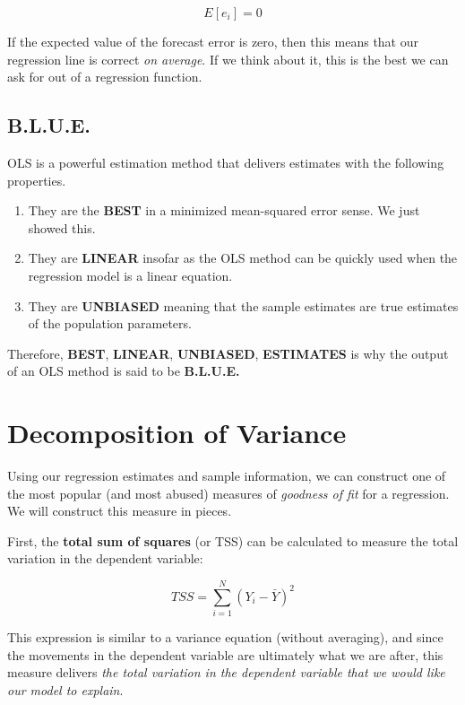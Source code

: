 \documentclass[
]{book}
\begin{document}
\[E[e_i]=0\]

If the expected value of the forecast error is zero, then this means that our regression line is correct \emph{on average}. If we think about it, this is the best we can ask for out of a regression function.

\hypertarget{b.l.u.e.}{%
\subsection{B.L.U.E.}\label{b.l.u.e.}}

OLS is a powerful estimation method that delivers estimates with the following properties.

\begin{enumerate}
\def\labelenumi{\arabic{enumi}.}
\item
  They are the \textbf{BEST} in a minimized mean-squared error sense. We just showed this.
\item
  They are \textbf{LINEAR} insofar as the OLS method can be quickly used when the regression model is a linear equation.
\item
  They are \textbf{UNBIASED} meaning that the sample estimates are true estimates of the population parameters.
\end{enumerate}

Therefore, \textbf{BEST}, \textbf{LINEAR}, \textbf{UNBIASED}, \textbf{ESTIMATES} is why the output of an OLS method is said to be \textbf{B.L.U.E.}

\hypertarget{decomposition-of-variance}{%
\section{Decomposition of Variance}\label{decomposition-of-variance}}

Using our regression estimates and sample information, we can construct one of the most popular (and most abused) measures of \emph{goodness of fit} for a regression. We will construct this measure in pieces.

First, the \textbf{total sum of squares} (or TSS) can be calculated to measure the total variation in the dependent variable:

\[TSS = \sum^{N}_{i=1}(Y_i - \bar{Y})^2\]

This expression is similar to a variance equation (without averaging), and since the movements in the dependent variable are ultimately what we are after, this measure delivers \emph{the total variation in the dependent variable that we would like our model to explain}.
\end{document}
